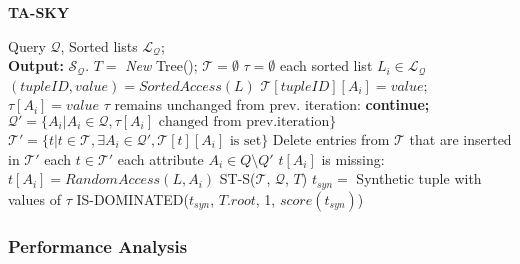 \begin{algorithm}[!htb]
\caption{{\bf TA-SKY}}
\begin{algorithmic}[1]
\label{alg:taSky}
 Query $\mathcal{Q}$, Sorted lists $\mathcal{L_Q}$; \\ {\bf Output:} $\mathcal{S}_\mathcal{Q}$.
\STATE $T = $ {\it New} Tree(); $\mathcal{T} = \emptyset$
    \STATE \hindent $\tau = \emptyset$
    \STATE {} each sorted list $L_i \in \mathcal{L_Q}$
        \STATE \hindent[2] $(tupleID, value) = SortedAccess(L)$
        \STATE \hindent[2] $\mathcal{T}[tupleID][A_i] = value$; $\tau[A_i] = value$
    \STATE {} $\tau$ remains unchanged from prev. iteration: {\bf continue;}
    \STATE \hindent $\mathcal{Q'} = \{A_i | A_i \in \mathcal{Q}, \tau[A_i] \text{ changed from prev.iteration}\}$
    \STATE \hindent $\mathcal{T'} = \{t | t \in \mathcal{T}, \exists A_i \in \mathcal{Q'}, \mathcal{T}[t][A_i] \text{ is set} \}$
    \STATE \hindent Delete entries from $\mathcal{T}$ that are inserted in $\mathcal{T'}$
    \STATE {} each $t \in \mathcal{T'}$
        \STATE {} each attribute $A_i \in Q \setminus Q'$
            \STATE {} $t[A_i]$ is missing: $t[A_i]= RandomAccess(L, A_i)$
    \STATE \hindent ST-S($\mathcal{T}$, $\mathcal{Q}$, $T$)
    \STATE \hindent $t_{syn}=$ Synthetic tuple with values of $\tau$
 IS-DOMINATED($t_{syn}$, $T.root$, 1, $score(t_{syn})$)
\end{algorithmic}
\end{algorithm}

\subsubsection{Performance Analysis}\label{sec:TASKY-performance}



